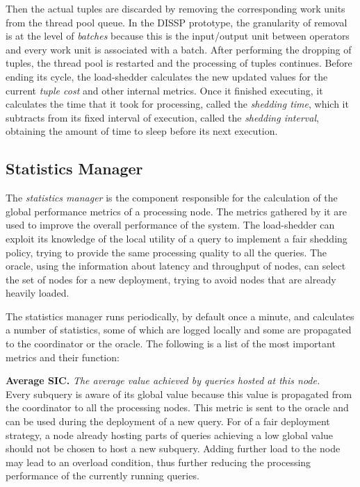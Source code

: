 Then the actual tuples are discarded by removing the corresponding work units from the thread pool queue.
In the DISSP prototype, the granularity of removal is at the level of \emph{batches} because this is the
input/output unit between operators and every work unit is associated with a batch. After performing the
dropping of tuples, the thread pool is restarted and the processing of tuples continues. Before ending
its cycle, the load-shedder calculates the new updated values for the current \emph{tuple cost} and other
internal metrics. Once it finished executing, it calculates the time that it took for processing, called
the \emph{shedding time}, which it subtracts from its fixed interval of execution, called the
\emph{shedding interval}, obtaining the amount of time to sleep before its next execution.

\subsection*{Statistics Manager}
The \emph{statistics manager} is the component responsible for the calculation of the global performance
metrics of a processing node. The metrics gathered by it are used to improve the overall
performance of the system. The load-shedder can exploit its knowledge of the local utility of a
query to implement a fair shedding policy, trying to provide the same processing quality to
all the queries. The oracle, using the information about latency and throughput of nodes, can select the set of
nodes for a new deployment, trying to avoid nodes that are already heavily loaded.

The statistics manager runs periodically, by default once a minute, and calculates a number of
statistics, some of which are logged locally and some are propagated to the coordinator or the
oracle. The following is a list of the most important metrics and their function:

\textbf{Average SIC.} \emph{The average \sic value achieved by queries hosted at this node.}\\
Every subquery is aware of its global \sic value because this value is propagated from the coordinator to
all the processing nodes. This metric is sent to the oracle and can be used during the deployment of
a new query. For of a fair deployment strategy, a node already hosting parts of queries
achieving a low global \sic value should not be chosen to host a new subquery. Adding further load
to the node may lead to an overload condition, thus further reducing the processing performance of the
currently running queries. 

